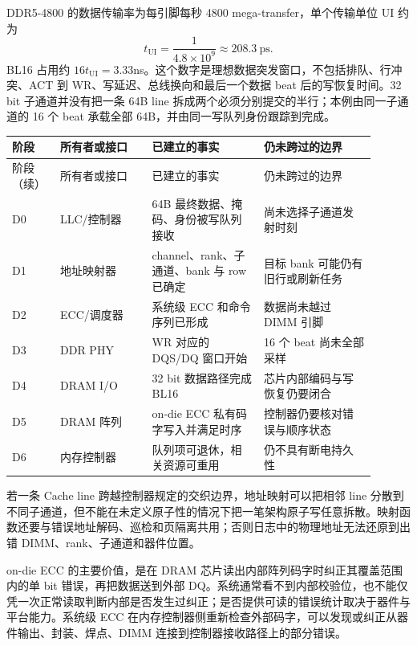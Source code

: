 
DDR5-4800 的数据传输率为每引脚每秒 4800 mega-transfer，单个传输单位 UI 约为
\[
  t_{\mathrm{UI}}=\frac{1}{4.8\times 10^9}\approx 208.3\ \mathrm{ps}.
\]
BL16 占用约 $16t_{\mathrm{UI}}=3.33$ns。这个数字是理想数据突发窗口，不包括排队、行冲突、ACT 到 WR、写延迟、总线换向和最后一个数据 beat 后的写恢复时间。32 bit 子通道并没有把一条 64B line 拆成两个必须分别提交的半行；本例由同一子通道的 16 个 beat 承载全部 64B，并由同一写队列身份跟踪到完成。

\begin{longtable}{L{0.09\linewidth}L{0.23\linewidth}L{0.29\linewidth}L{0.29\linewidth}}
\toprule
阶段 & 所有者或接口 & 已建立的事实 & 仍未跨过的边界 \\
\midrule
\endfirsthead
\toprule
阶段（续） & 所有者或接口 & 已建立的事实 & 仍未跨过的边界 \\
\midrule
\endhead
D0 & LLC/控制器 & 64B 最终数据、掩码、身份被写队列接收 & 尚未选择子通道发射时刻 \\\tablerowrule
D1 & 地址映射器 & channel、rank、子通道、bank 与 row 已确定 & 目标 bank 可能仍有旧行或刷新任务 \\\tablerowrule
D2 & ECC/调度器 & 系统级 ECC 和命令序列已形成 & 数据尚未越过 DIMM 引脚 \\\tablerowrule
D3 & DDR PHY & WR 对应的 DQS/DQ 窗口开始 & 16 个 beat 尚未全部采样 \\\tablerowrule
D4 & DRAM I/O & 32 bit 数据路径完成 BL16 & 芯片内部编码与写恢复仍要闭合 \\\tablerowrule
D5 & DRAM 阵列 & on-die ECC 私有码字写入并满足时序 & 控制器仍要核对错误与顺序状态 \\\tablerowrule
D6 & 内存控制器 & 队列项可退休，相关资源可重用 & 仍不具有断电持久性 \\
\bottomrule
\end{longtable}

若一条 Cache line 跨越控制器规定的交织边界，地址映射可以把相邻 line 分散到不同子通道，但不能在未定义原子性的情况下把一笔架构原子写任意拆散。映射函数还要与错误地址解码、巡检和页隔离共用；否则日志中的物理地址无法还原到出错 DIMM、rank、子通道和器件位置。


on-die ECC 的主要价值，是在 DRAM 芯片读出内部阵列码字时纠正其覆盖范围内的单 bit 错误，再把数据送到外部 DQ。系统通常看不到内部校验位，也不能仅凭一次正常读取判断内部是否发生过纠正；是否提供可读的错误统计取决于器件与平台能力。系统级 ECC 在内存控制器侧重新检查外部码字，可以发现或纠正从器件输出、封装、焊点、DIMM 连接到控制器接收路径上的部分错误。

